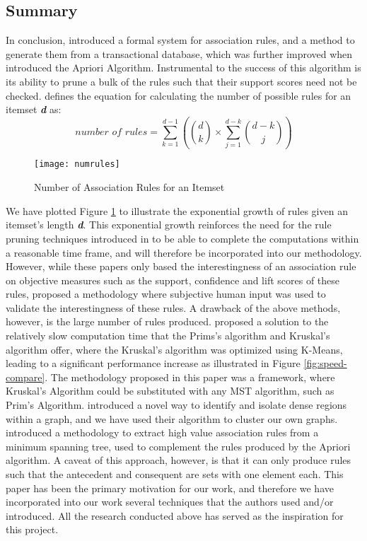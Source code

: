 \subsection{Summary}
In conclusion,  introduced a formal system for association rules, and a method to generate them from a transactional database, which was further improved when  introduced the Apriori Algorithm.
Instrumental to the success of this algorithm is its ability to prune a bulk of the rules such that their support scores need not be checked.  defines the equation for calculating the number of possible rules for an itemset \textbf{\textit{d}} as:
\[
\textit{number of rules} = \sum\limits_{k=1}^{d-1} \left(\binom{d}{k} \times \sum\limits_{j=1}^{d-k}\binom{d-k}{j}  \right)
\]
\begin{figure}[H]
\centering
\texttt{[image: numrules]}
\caption{Number of Association Rules for an Itemset}
\label{fig:numrules}
\end{figure}
We have plotted Figure \ref{fig:numrules} to illustrate the exponential growth of rules given an itemset's length \textbf{\textit{d}}.
This exponential growth reinforces the need for the rule pruning techniques introduced in  to be able to complete the computations within a reasonable time frame, and will therefore be incorporated into our methodology.
However, while these papers only based the interestingness of an association rule on objective measures such as the support, confidence and lift scores of these rules,  proposed a methodology where subjective human input was used to validate the interestingness of these rules. A drawback of the above methods, however, is the large number of rules produced.
 proposed a solution to the relatively slow computation time that the Prims's algorithm and Kruskal's algorithm offer, where the Kruskal's algorithm was optimized using K-Means, leading to a significant performance increase as illustrated in Figure \ref{fig:speed-compare}. The methodology proposed in this paper was a framework, where Kruskal's Algorithm could be substituted with any MST algorithm, such as Prim's Algorithm.
 introduced a novel way to identify and isolate dense regions within a graph, and we have used their algorithm to cluster our own graphs.
 introduced a methodology to extract high value association rules from a minimum spanning tree, used to complement the rules produced by the Apriori algorithm. A caveat of this approach, however, is that it can only produce rules such that the antecedent and consequent are sets with one element each. This paper has been the primary motivation for our work, and therefore we have incorporated into our work several techniques that the authors used and/or introduced.
All the research conducted above has served as the inspiration for this project.
